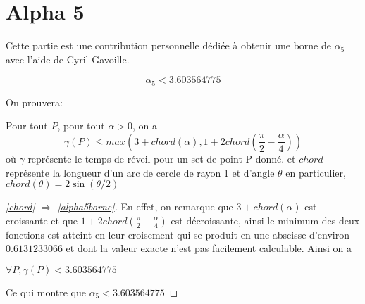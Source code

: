 \section{Alpha 5}

Cette partie est une contribution personnelle dédiée à obtenir une borne de $\alpha_5$ avec l'aide de Cyril Gavoille.

\begin{theorem}\label{alpha5borne}

$$\alpha_5 < 3.603564775$$

\end{theorem}

On prouvera:

\begin{lemma}\label{chord}
Pour tout $P$, pour tout $\alpha >0$, on a
$$\gamma(P) \leq max\left(3 + chord\left(\alpha\right), 1 + 2chord\left(\frac{\pi}{2} - \frac{\alpha}{4}\right)\right)$$
où $\gamma$ représente le temps de réveil pour un set de point P donné. et $chord$ représente la longueur d'un arc de cercle de rayon 1 et d'angle $\theta$ en particulier, $chord(\theta) = 2\sin(\theta/2)$
\end{lemma}

\begin{proof}[\ref{chord} $\Rightarrow$ \ref{alpha5borne}]
En effet, on remarque que $3+chord(\alpha)$ est croissante et que $1 + 2chord(\frac{\pi}{2} - \frac{\alpha}{4})$ est décroissante, ainsi le minimum des deux fonctions est atteint en leur croisement qui se produit en une abscisse d'environ $0.6131233066$ et dont la valeur exacte n'est pas facilement calculable. Ainsi on a

\(\forall P, \gamma(P) < 3.603564775\)

Ce qui montre que $\alpha_5 < 3.603564775$

\end{proof}

